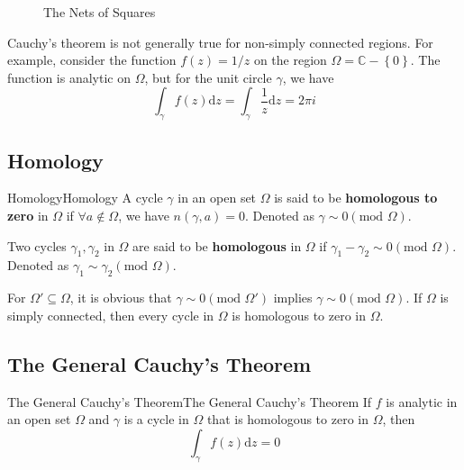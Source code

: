 \documentclass[../main.tex]{subfiles}
\begin{document}
\begin{figure}[ht]
    \centering
    \caption{The Nets of Squares}
    \label{fig:the-nets-of-squares}
\end{figure}

Cauchy's theorem is not generally true for non-simply connected regions. For example, consider the function $f(z) = 1 / z$ on the region $\Omega = \mathbb{C}-\left\{ 0 \right\}$. The function is analytic on $\Omega$, but for the unit circle $\gamma$, we have
\begin{equation*}
	\int_{\gamma} f(z) \mathrm{d} z = \int_{\gamma} \frac{1}{z} \mathrm{d} z = 2\pi i
\end{equation*}

\subsection{Homology}

\begin{definition}{Homology}{Homology}
	A cycle $\gamma$ in an open set $\Omega$ is said to be \textbf{homologous to zero} in $\Omega$ if $\forall a\notin \Omega$, we have $n(\gamma,a) = 0$. Denoted as $\gamma \sim 0 (\text{mod } \Omega)$.

	Two cycles $\gamma_1,\gamma_2$ in $\Omega$ are said to be \textbf{homologous} in $\Omega$ if $\gamma_1 - \gamma_2 \sim 0 (\text{mod } \Omega)$. Denoted as $\gamma_1 \sim \gamma_2 (\text{mod } \Omega)$.
\end{definition}
For $\Omega' \subseteq \Omega$, it is obvious that $\gamma\sim 0 (\text{mod } \Omega')$ implies $\gamma\sim 0 (\text{mod } \Omega)$. If $\Omega$ is simply connected, then every cycle in $\Omega$ is homologous to zero in $\Omega$.

\subsection{The General Cauchy's Theorem}
\begin{theorem}{The General Cauchy's Theorem}{The General Cauchy's Theorem}
	If $f$ is analytic in an open set $\Omega$ and $\gamma$ is a cycle in $\Omega$ that is homologous to zero in $\Omega$, then
	\begin{equation}
		\int_{\gamma} f(z) \mathrm{d} z = 0
	\end{equation}
\end{theorem}
\end{document}
